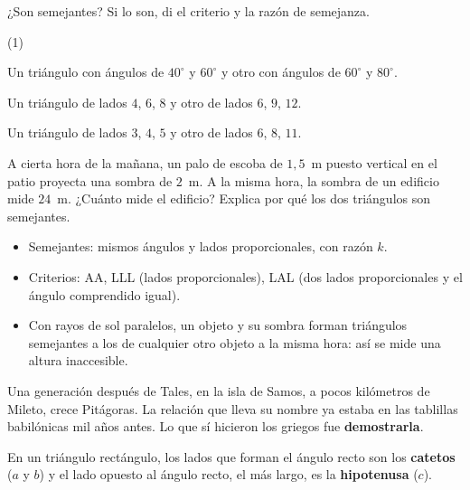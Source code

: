 \documentclass[11pt]{article}
\begin{document}
\begin{preguntas}
\pregunta ¿Son semejantes? Si lo son, di el criterio y la razón de
semejanza.
\begin{opciones*}(1)
  \item Un triángulo con ángulos de $40^\circ$ y $60^\circ$ y otro con
        ángulos de $60^\circ$ y $80^\circ$.
  \item Un triángulo de lados $4$, $6$, $8$ y otro de lados $6$, $9$, $12$.
  \item Un triángulo de lados $3$, $4$, $5$ y otro de lados $6$, $8$, $11$.
\end{opciones*}
\espacio{3cm}
\pregunta A cierta hora de la mañana, un palo de escoba de $1{,}5$~m puesto
vertical en el patio proyecta una sombra de $2$~m. A la misma hora, la
sombra de un edificio mide $24$~m. ¿Cuánto mide el edificio? Explica por
qué los dos triángulos son semejantes.
\espacio{3cm}
\end{preguntas}

\begin{resumen}
\begin{itemize}
  \item Semejantes: mismos ángulos y lados proporcionales, con razón $k$.
  \item Criterios: AA, LLL (lados proporcionales), LAL (dos lados
        proporcionales y el ángulo comprendido igual).
  \item Con rayos de sol paralelos, un objeto y su sombra forman triángulos
        semejantes a los de cualquier otro objeto a la misma hora: así se
        mide una altura inaccesible.
\end{itemize}
\end{resumen}

\label{tema:pitagoras}

\begin{hilo}
Una generación después de Tales, en la isla de Samos, a pocos kilómetros
de Mileto, crece Pitágoras. La relación que lleva su nombre ya estaba en las
tablillas babilónicas mil años antes. Lo que sí hicieron los griegos fue
\textbf{demostrarla}.
\end{hilo}

En un triángulo rectángulo, los lados que forman el ángulo recto son los
\textbf{catetos} ($a$ y $b$) y el lado opuesto al ángulo recto, el más
largo, es la \textbf{hipotenusa} ($c$).
\end{document}
